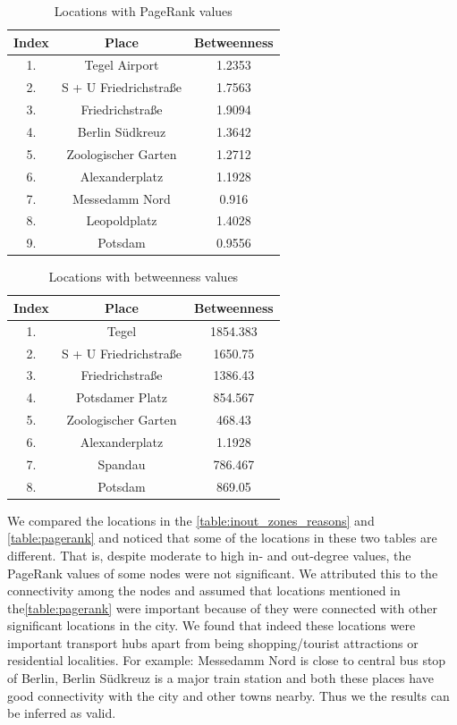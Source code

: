 \begin{table}[ht]
	\caption{Locations with PageRank values}
	\centering
	\begin{tabular}{c c c}
		\hline
		Index &Place & Betweenness\\[0.1ex]
		\hline
		1. & Tegel Airport  & 1.2353 \\		
		2. & S + U Friedrichstraße & 1.7563 \\
		3. & Friedrichstraße & 1.9094 \\		
		4. & Berlin Südkreuz & 1.3642 \\			
		5. & Zoologischer Garten & 1.2712 \\		
		6. & Alexanderplatz & 1.1928 \\				
		7. & Messedamm Nord & 0.916 \\
		8. & Leopoldplatz & 1.4028 \\		
		9. & Potsdam & 0.9556 \\  [1ex]
		\hline
	\end{tabular}
	\label{table:pagerank}
\end{table}

\begin{table}[ht]
	\caption{Locations with betweenness values}
	\centering
	\begin{tabular}{c c c}
		\hline
		Index &Place & Betweenness\\[0.1ex]
		\hline
		1. & Tegel  & 1854.383 \\		
		2. & S + U Friedrichstraße & 1650.75 \\
		3. & Friedrichstraße & 1386.43 \\		
		4. & Potsdamer Platz & 854.567 \\			
		5. & Zoologischer Garten & 468.43 \\		
		6. & Alexanderplatz & 1.1928 \\				
		7. & Spandau & 786.467 \\		
		8. & Potsdam & 869.05 \\  [1ex]
		\hline
	\end{tabular}
	\label{table:betweenness}
\end{table}
\FloatBarrier

We compared the locations in the \autoref{table:inout_zones_reasons} and \autoref{table:pagerank} and noticed that some of the locations in these two tables are different. That is, despite moderate to high in- and out-degree values, the PageRank values of some nodes were not significant. We attributed this to the connectivity among the nodes and assumed that locations mentioned in the\autoref{table:pagerank} were important because of they were connected with other significant locations in the city. We found that indeed these locations were important transport hubs apart from being shopping/tourist attractions or residential localities. For example: Messedamm Nord is close to central bus stop of Berlin, Berlin Südkreuz is a major train station and both these places have good connectivity with the city and other towns nearby. Thus we the results can be inferred as valid.

